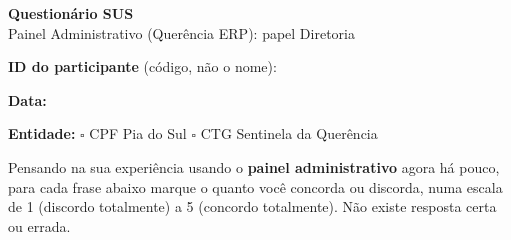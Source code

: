 \documentclass[11pt,a4paper]{article}
\begin{document}
\begin{center}
  {\LARGE\bfseries\color{brandgreen} Questionário SUS}\\[1mm]
  {\large Painel Administrativo (Querência ERP): papel Diretoria}
\end{center}

\vspace{3mm}
\noindent\textbf{ID do participante} (código, não o nome): \makebox[4cm]{\hrulefill}

\vspace{2mm}
\noindent\textbf{Data:} \makebox[3.5cm]{\hrulefill}

\vspace{2mm}
\noindent\textbf{Entidade:} $\square$ CPF Pia do Sul \hspace{8mm} $\square$ CTG Sentinela da Querência

\vspace{4mm}
\noindent\colorbox{lightbg}{%
  \begin{minipage}{0.95\linewidth}
  \vspace{1mm}
  Pensando na sua experiência usando o \textbf{painel administrativo} agora há pouco, para cada
  frase abaixo marque o quanto você concorda ou discorda, numa escala de 1 (discordo totalmente) a
  5 (concordo totalmente). Não existe resposta certa ou errada.
  \vspace{1mm}
  \end{minipage}%
}
\end{document}
